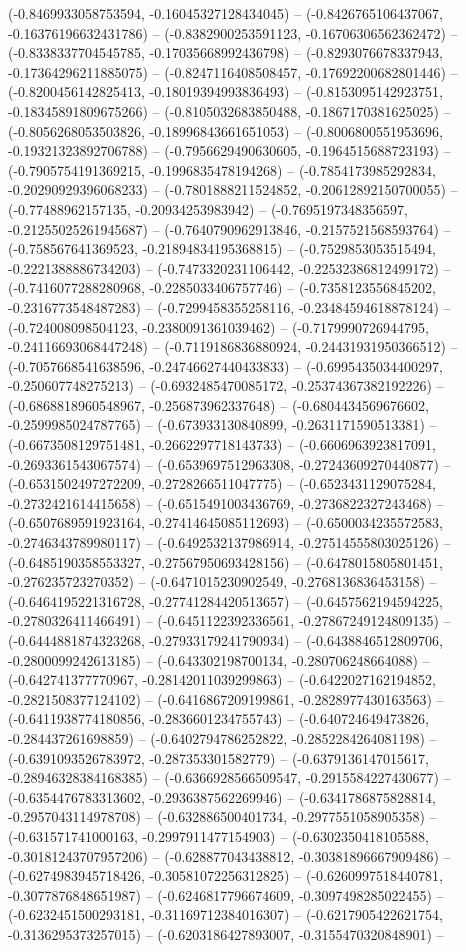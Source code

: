 (-0.8469933058753594, -0.16045327128434045) -- (-0.8426765106437067, -0.16376196632431786) -- (-0.8382900253591123, -0.16706306562362472) -- (-0.8338337704545785, -0.17035668992436798) -- (-0.8293076678337943, -0.17364296211885075) -- (-0.8247116408508457, -0.17692200682801446) -- (-0.8200456142825413, -0.18019394993836493) -- (-0.8153095142923751, -0.18345891809675266) -- (-0.8105032683850488, -0.1867170381625025) -- (-0.8056268053503826, -0.18996843661651053) -- (-0.8006800551953696, -0.19321323892706788) -- (-0.7956629490630605, -0.1964515688723193) -- (-0.7905754191369215, -0.1996835478194268) -- (-0.7854173985292834, -0.20290929396068233) -- (-0.7801888211524852, -0.20612892150700055) -- (-0.77488962157135, -0.20934253983942) -- (-0.7695197348356597, -0.21255025261945687) -- (-0.7640790962913846, -0.2157521568593764) -- (-0.758567641369523, -0.21894834195368815) -- (-0.7529853053515494, -0.2221388886734203) -- (-0.7473320231106442, -0.22532386812499172) -- (-0.7416077288280968, -0.2285033406757746) -- (-0.7358123556845202, -0.2316773548487283) -- (-0.7299458355258116, -0.23484594618878124) -- (-0.724008098504123, -0.2380091361039462) -- (-0.7179990726944795, -0.24116693068447248) -- (-0.7119186836880924, -0.24431931950366512) -- (-0.7057668541638596, -0.24746627440433833) -- (-0.6995435034400297, -0.250607748275213) -- (-0.6932485470085172, -0.25374367382192226) -- (-0.6868818960548967, -0.256873962337648) -- (-0.6804434569676602, -0.2599985024787765) -- (-0.673933130840899, -0.2631171590513381) -- (-0.6673508129751481, -0.2662297718143733) -- (-0.6606963923817091, -0.2693361543067574) -- (-0.6539697512963308, -0.27243609270440877) -- (-0.6531502497272209, -0.2728266511047775) -- (-0.6523431129075284, -0.2732421614415658) -- (-0.6515491003436769, -0.2736822327243468) -- (-0.6507689591923164, -0.27414645085112693) -- (-0.6500034235572583, -0.2746343789980117) -- (-0.6492532137986914, -0.27514555803025126) -- (-0.6485190358553327, -0.27567950693428156) -- (-0.6478015805801451, -0.276235723270352) -- (-0.6471015230902549, -0.2768136836453158) -- (-0.6464195221316728, -0.27741284420513657) -- (-0.6457562194594225, -0.2780326411466491) -- (-0.6451122392336561, -0.27867249124809135) -- (-0.6444881874323268, -0.27933179241790934) -- (-0.6438846512809706, -0.2800099242613185) -- (-0.643302198700134, -0.280706248664088) -- (-0.642741377770967, -0.28142011039299863) -- (-0.6422027162194852, -0.2821508377124102) -- (-0.6416867209199861, -0.2828977430163563) -- (-0.6411938774180856, -0.2836601234755743) -- (-0.640724649473826, -0.284437261698859) -- (-0.6402794786252822, -0.2852284264081198) -- (-0.6391093526783972, -0.287353301582779) -- (-0.6379136147015617, -0.28946328384168385) -- (-0.6366928566509547, -0.2915584227430677) -- (-0.6354476783313602, -0.2936387562269946) -- (-0.6341786875828814, -0.2957043114978708) -- (-0.632886500401734, -0.2977551058905358) -- (-0.631571741000163, -0.2997911477154903) -- (-0.6302350418105588, -0.30181243707957206) -- (-0.628877043438812, -0.30381896667909486) -- (-0.6274983945718426, -0.30581072256312825) -- (-0.6260997518440781, -0.3077876848651987) -- (-0.6246817796674609, -0.3097498285022455) -- (-0.6232451500293181, -0.31169712384016307) -- (-0.6217905422621754, -0.3136295373257015) -- (-0.6203186427893007, -0.3155470320848901) -- 
